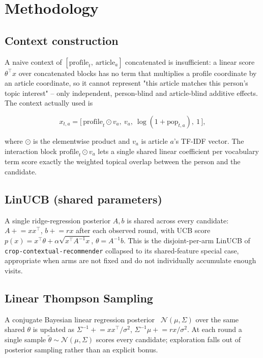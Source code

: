 \section{Methodology}

\subsection{Context construction}
A naive context of $[\text{profile}_t,\ \text{article}_a]$ concatenated is
insufficient: a linear score $\theta^\top x$ over concatenated blocks has no
term that multiplies a profile coordinate by an article coordinate, so it
cannot represent "this article matches this person's topic interest" --
only independent, person-blind and article-blind additive effects. The
context actually used is

\begin{equation}
  x_{t,a} = \big[\,\text{profile}_t \odot v_a,\ v_a,\ \log(1+\text{pop}_{t,a}),\ 1\,\big],
  \label{eq:context}
\end{equation}

where $\odot$ is the elementwise product and $v_a$ is article $a$'s TF-IDF
vector. The interaction block $\text{profile}_t \odot v_a$ lets a single
shared linear coefficient per vocabulary term score exactly the weighted
topical overlap between the person and the candidate.

\subsection{LinUCB (shared parameters)}
A single ridge-regression posterior $A, b$ is shared across every
candidate: $A \mathrel{+}= x x^\top$, $b \mathrel{+}= r x$ after each
observed round, with UCB score $p(x) = x^\top \theta + \alpha\sqrt{x^\top
A^{-1} x}$, $\theta = A^{-1}b$. This is the disjoint-per-arm LinUCB of
\texttt{crop-contextual-recommender} collapsed to its shared-feature
special case, appropriate when arms are not fixed and do not individually
accumulate enough visits.

\subsection{Linear Thompson Sampling}
A conjugate Bayesian linear regression posterior~\cite{agrawal2013thompson}
$\mathcal{N}(\mu, \Sigma)$ over the same shared $\theta$ is updated as
$\Sigma^{-1} \mathrel{+}= xx^\top/\sigma^2$,
$\Sigma^{-1}\mu \mathrel{+}= rx/\sigma^2$. At each round a single sample
$\tilde\theta \sim \mathcal{N}(\mu, \Sigma)$ scores every candidate;
exploration falls out of posterior sampling rather than an explicit bonus.

